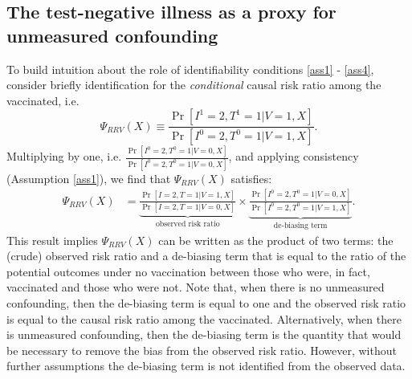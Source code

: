\documentclass[11pt]{article}
\begin{document}
\subsection{The test-negative illness as a proxy for unmeasured confounding} \label{sec:effect_among_vaccinated}
To build intuition about the role of identifiability conditions \ref{ass1} - \ref{ass4}, consider briefly identification for the \textit{conditional} causal risk ratio among the vaccinated, i.e.
\begin{equation*}
    \Psi_{RRV}(X) \equiv \frac{\Pr[I^1 = 2, T^1 = 1 | V = 1, X]}{\Pr[I^0 = 2, T^0 = 1 | V = 1, X]}.
\end{equation*}
Multiplying by one, i.e. $\frac{\Pr[I^0 = 2, T^0 = 1| V = 0, X]}{\Pr[I^0 = 2, T^0 = 1 | V = 0, X]}$, and applying consistency (Assumption \ref{ass1}), we find that $\Psi_{RRV}(X)$ satisfies:
\begin{align} \label{eqn:decomposition}
    \Psi_{RRV}(X) &=\underbrace{\frac{\Pr[I = 2, T = 1 | V = 1, X]}{\Pr[I = 2, T = 1 | V = 0, X]}}_{\text{observed risk ratio}} \times \underbrace{\frac{\Pr[I^0 = 2, T^0 = 1 | V = 0, X]}{\Pr[I^0 = 2, T^0 = 1 | V = 1, X]}}_{\text{de-biasing term}}.
\end{align}
This result implies $\Psi_{RRV}(X)$ can be written as the product of two terms: the (crude) observed risk ratio and a de-biasing term that is equal to the ratio of the potential outcomes under no vaccination between those who were, in fact, vaccinated and those who were not. Note that, when there is no unmeasured confounding, then the de-biasing term is equal to one and the observed risk ratio is equal to the causal risk ratio among the vaccinated. Alternatively, when there is unmeasured confounding, then the de-biasing term is the quantity that would be necessary to remove the bias from the observed risk ratio. However, without further assumptions the de-biasing term is not identified from the observed data. 
\end{document}

